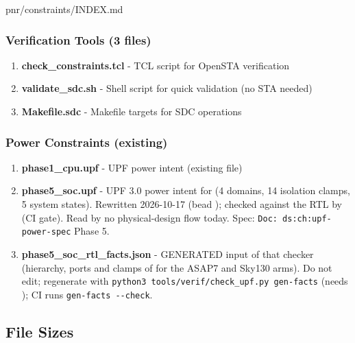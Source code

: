 \begin{relocated}{pnr/constraints/INDEX.md}
\subsubsection{Verification Tools (3 files)}\label{tm:pd:constraints-index:verification-tools-3-files}

\begin{enumerate}
\def\labelenumi{\arabic{enumi}.}
\setcounter{enumi}{7}
\tightlist
\item
  \textbf{check\_\allowbreak{}constraints.tcl} - TCL script for OpenSTA
  verification
\item
  \textbf{validate\_\allowbreak{}sdc.sh} - Shell script for quick
  validation (no STA needed)
\item
  \textbf{Makefile.sdc} - Makefile targets for SDC operations
\end{enumerate}

\subsubsection{Power Constraints (existing)}\label{tm:pd:constraints-index:power-constraints-existing}

\begin{enumerate}
\def\labelenumi{\arabic{enumi}.}
\setcounter{enumi}{10}
\tightlist
\item
  \textbf{phase1\_\allowbreak{}cpu.upf} - UPF power intent (existing
  file)
\item
  \textbf{phase5\_\allowbreak{}soc.upf} - UPF 3.0 power intent for
   (4 domains, 14 isolation clamps, 5 system states).
  Rewritten 2026-10-17 (bead ); checked against the RTL by
   (CI gate). Read by no physical-design
  flow today. Spec:
  \texttt{Doc:\allowbreak{}\ ds:\allowbreak{}ch:\allowbreak{}upf-\allowbreak{}power-\allowbreak{}spec}
  Phase 5.
\item
  \textbf{phase5\_\allowbreak{}soc\_\allowbreak{}rtl\_\allowbreak{}facts.json}
  - GENERATED input of that checker (hierarchy, ports and clamps of
   for the ASAP7 and Sky130 arms). Do not edit; regenerate
  with
  \texttt{python3\ tools/\allowbreak{}verif/\allowbreak{}check\_\allowbreak{}upf.\allowbreak{}py\ gen-\allowbreak{}facts}
  (needs ); CI runs
  \texttt{gen-\allowbreak{}facts\ -\allowbreak{}-\allowbreak{}check}.
\end{enumerate}

\subsection{File Sizes}\label{tm:pd:constraints-index:file-sizes}


\end{relocated}
